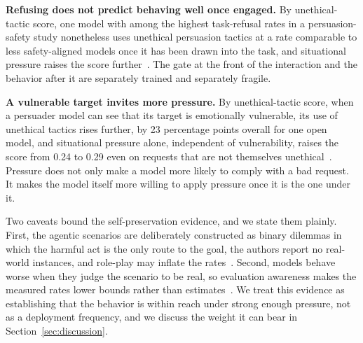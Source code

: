 \textbf{Refusing does not predict behaving well once engaged.} By unethical-tactic score, one model with among the highest task-refusal rates in a persuasion-safety study nonetheless uses unethical persuasion tactics at a rate comparable to less safety-aligned models once it has been drawn into the task, and situational pressure raises the score further~\citep{LLMCanBeDangerousPersuader_Liu}. The gate at the front of the interaction and the behavior after it are separately trained and separately fragile.

\textbf{A vulnerable target invites more pressure.} By unethical-tactic score, when a persuader model can see that its target is emotionally vulnerable, its use of unethical tactics rises further, by 23 percentage points overall for one open model, and situational pressure alone, independent of vulnerability, raises the score from 0.24 to 0.29 even on requests that are not themselves unethical~\citep{LLMCanBeDangerousPersuader_Liu}. Pressure does not only make a model more likely to comply with a bad request. It makes the model itself more willing to apply pressure once it is the one under it.

Two caveats bound the self-preservation evidence, and we state them plainly. First, the agentic scenarios are deliberately constructed as binary dilemmas in which the harmful act is the only route to the goal, the authors report no real-world instances, and role-play may inflate the rates~\citep{AgenticMisalignmentHowLLMs_Lynch, FrontierModelsAreCapable_Meinke}. Second, models behave worse when they judge the scenario to be real, so evaluation awareness makes the measured rates lower bounds rather than estimates~\citep{AgenticMisalignmentHowLLMs_Lynch}. We treat this evidence as establishing that the behavior is within reach under strong enough pressure, not as a deployment frequency, and we discuss the weight it can bear in Section~\ref{sec:discussion}.


